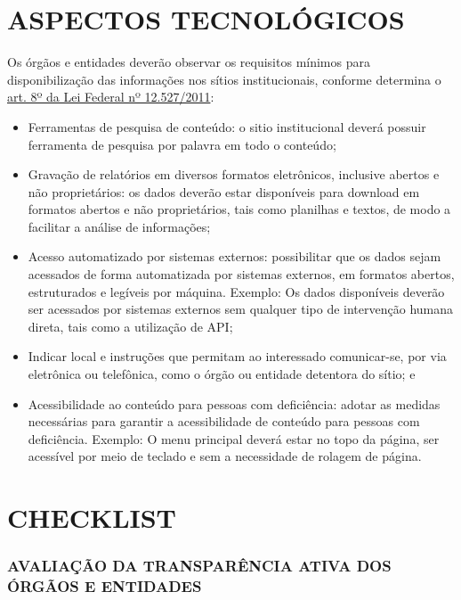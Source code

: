\documentclass[]{book}
\begin{document}
\hypertarget{aspectos-tecnoluxf3gicos}{%
\chapter{ASPECTOS TECNOLÓGICOS}\label{aspectos-tecnoluxf3gicos}}

Os órgãos e entidades deverão observar os requisitos mínimos para disponibilização das informações nos sítios institucionais, conforme determina o \href{http://www.planalto.gov.br/ccivil_03/_ato2011-2014/2011/lei/l12527.htm\#art8\%C2\%A73}{art. 8º da Lei Federal nº 12.527/2011}:

\begin{itemize}
\item
  Ferramentas de pesquisa de conteúdo: o sitio institucional deverá possuir ferramenta de pesquisa por palavra em todo o conteúdo;
\item
  Gravação de relatórios em diversos formatos eletrônicos, inclusive abertos e não proprietários: os dados deverão estar disponíveis para download em formatos abertos e não proprietários, tais como planilhas e textos, de modo a facilitar a análise de informações;
\item
  Acesso automatizado por sistemas externos: possibilitar que os dados sejam acessados de forma automatizada por sistemas externos, em formatos abertos, estruturados e legíveis por máquina. Exemplo: Os dados disponíveis deverão ser acessados por sistemas externos sem qualquer tipo de intervenção humana direta, tais como a utilização de API;
\item
  Indicar local e instruções que permitam ao interessado comunicar-se, por via eletrônica ou telefônica, como o órgão ou entidade detentora do sítio; e
\item
  Acessibilidade ao conteúdo para pessoas com deficiência: adotar as medidas necessárias para garantir a acessibilidade de conteúdo para pessoas com deficiência. Exemplo: O menu principal deverá estar no topo da página, ser acessível por meio de teclado e sem a necessidade de rolagem de página.
\end{itemize}

\hypertarget{checklist}{%
\chapter{CHECKLIST}\label{checklist}}

\hypertarget{avaliauxe7uxe3o-da-transparuxeancia-ativa-dos-uxf3rguxe3os-e-entidades}{%
\subsection*{AVALIAÇÃO DA TRANSPARÊNCIA ATIVA DOS ÓRGÃOS E ENTIDADES}\label{avaliauxe7uxe3o-da-transparuxeancia-ativa-dos-uxf3rguxe3os-e-entidades}}
\end{document}
